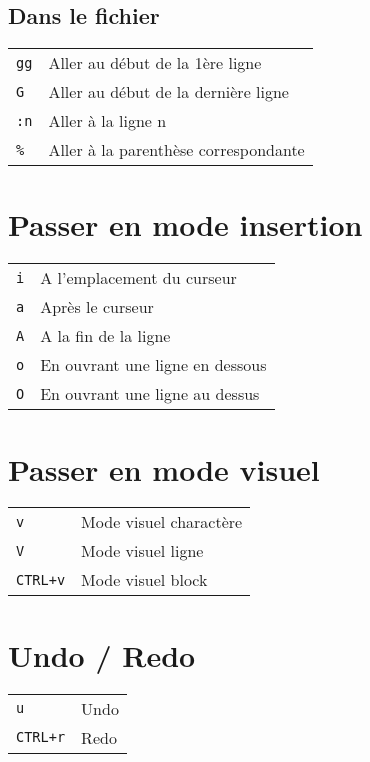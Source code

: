 \documentclass[8pt,landscape,a4paper]{article}
\begin{document}
\begin{multicols*}{3}
    \subsection{Dans le fichier }
    \begin{tabular}{m{2cm} l}
        \texttt{gg} & Aller au début de la 1ère ligne \\
        \texttt{G}  & Aller au début de la dernière ligne \\
        \texttt{:n} & Aller à la ligne n \\
        \texttt{\%} & Aller à la parenthèse correspondante \\
    \end{tabular}

    \section{Passer en mode insertion}
    \begin{tabular}{m{2cm} l}
        \texttt{i}  & A l'emplacement du curseur\\
        \texttt{a}  & Après le curseur\\
        \texttt{A}  & A la fin de la ligne\\
        \texttt{o}  & En ouvrant une ligne en dessous\\
        \texttt{O}  & En ouvrant une ligne au dessus\\
    \end{tabular}

    \section{Passer en mode visuel}
    \begin{tabular}{m{2cm} l}
        \texttt{v}& Mode visuel charactère\\
        \texttt{V}& Mode visuel ligne\\
        \texttt{CTRL+v}& Mode visuel block\\
    \end{tabular}

    \section{Undo / Redo}
    \begin{tabular}{m{2cm} l}
        \texttt{u}& Undo\\
        \texttt{CTRL+r}& Redo\\
    \end{tabular}\\


\end{multicols*}
\end{document}
